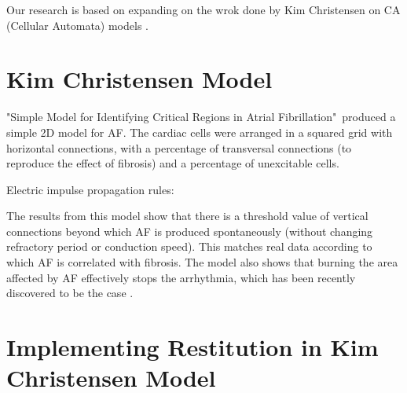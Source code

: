 \documentclass[twocolumn, a1paper]{article}
\begin{document}
 
 Our research is based on expanding on the wrok done by Kim Christensen on CA (Cellular Automata) models \cite{Christensen}.




\section{\textbf{Kim Christensen Model}}


"Simple Model for Identifying Critical Regions in Atrial Fibrillation"~\cite{Christensen}produced a simple 2D model for AF. The cardiac cells were arranged in a squared grid with horizontal connections, with a percentage of transversal connections (to reproduce the effect of fibrosis) and a percentage of unexcitable cells.

Electric impulse propagation rules:







The results from this model show that there is a threshold value of vertical connections beyond which AF is produced spontaneously (without changing refractory period or conduction speed). This matches real data according to which AF is correlated with fibrosis. 
The model also shows that burning the area affected by AF effectively stops the arrhythmia, which has been recently discovered to be the case . 






\section{\textbf{Implementing Restitution in Kim Christensen Model}} %
\end{document}
